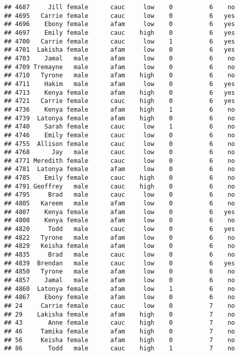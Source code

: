 \documentclass[
]{article}
\begin{document}
\begin{verbatim}
## 4687     Jill female      cauc     low    0          6    no
## 4695   Carrie female      cauc     low    0          6   yes
## 4696    Ebony female      afam     low    0          6   yes
## 4697    Emily female      cauc    high    0          6   yes
## 4700   Carrie female      cauc     low    1          6   yes
## 4701  Lakisha female      afam     low    0          6   yes
## 4703    Jamal   male      afam     low    0          6    no
## 4709 Tremayne   male      afam     low    0          6    no
## 4710   Tyrone   male      afam    high    0          6    no
## 4711    Hakim   male      afam     low    0          6   yes
## 4713    Kenya female      afam    high    0          6   yes
## 4721   Carrie female      cauc    high    0          6   yes
## 4736    Kenya female      afam    high    1          6    no
## 4739  Latonya female      afam    high    0          6    no
## 4740    Sarah female      cauc     low    1          6    no
## 4746    Emily female      cauc     low    0          6    no
## 4755  Allison female      cauc     low    0          6    no
## 4768      Jay   male      cauc     low    0          6    no
## 4771 Meredith female      cauc     low    0          6    no
## 4781  Latonya female      afam     low    0          6    no
## 4785    Emily female      cauc    high    0          6    no
## 4791 Geoffrey   male      cauc    high    0          6    no
## 4795     Brad   male      cauc     low    0          6    no
## 4805   Kareem   male      afam     low    0          6    no
## 4807    Kenya female      afam     low    0          6   yes
## 4808    Kenya female      afam     low    0          6    no
## 4820     Todd   male      cauc     low    0          6   yes
## 4822   Tyrone   male      afam     low    0          6    no
## 4829   Keisha female      afam     low    0          6    no
## 4835     Brad   male      cauc     low    0          6    no
## 4839  Brendan   male      cauc     low    0          6   yes
## 4850   Tyrone   male      afam     low    0          6    no
## 4857    Jamal   male      afam     low    0          6    no
## 4860  Latonya female      afam     low    1          6    no
## 4867    Ebony female      afam     low    0          6    no
## 24     Carrie female      cauc     low    0          7    no
## 29    Lakisha female      afam    high    0          7    no
## 43       Anne female      cauc    high    0          7    no
## 46     Tamika female      afam    high    0          7    no
## 56     Keisha female      afam    high    0          7    no
## 86       Todd   male      cauc    high    1          7    no

\end{verbatim}
\end{document}
